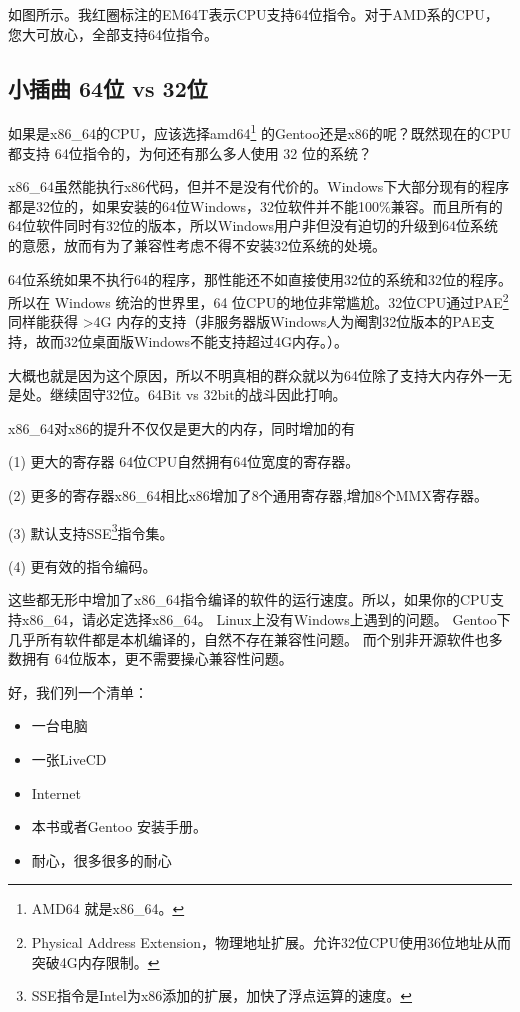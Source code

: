 如图\thefigure{}所示。我红圈标注的EM64T表示CPU支持64位指令。对于AMD系的CPU，您大可放心，全部支持64位指令。


\begin{insertnote}
\subsection*{小插曲  64位 vs 32位}

如果是x86\_64的CPU，应该选择amd64\footnote{AMD64 就是x86\_64。}
的Gentoo还是x86的呢？既然现在的CPU都支持 64位指令的，为何还有那么多人使用 32 位的系统？

x86\_64虽然能执行x86代码，但并不是没有代价的。Windows下大部分现有的程序都是32位的，如果安装的64位Windows，32位软件并不能100\%兼容。而且所有的64位软件同时有32位的版本，所以Windows用户非但没有迫切的升级到64位系统的意愿，放而有为了兼容性考虑不得不安装32位系统的处境。

64位系统如果不执行64的程序，那性能还不如直接使用32位的系统和32位的程序。所以在 Windows 统治的世界里，64 位CPU的地位非常尴尬。32位CPU通过PAE\footnote{Physical Address Extension，物理地址扩展。允许32位CPU使用36位地址从而突破4G内存限制。}同样能获得 >4G 内存的支持（非服务器版Windows人为阉割32位版本的PAE支持，故而32位桌面版Windows不能支持超过4G内存。）。

大概也就是因为这个原因，所以不明真相的群众就以为64位除了支持大内存外一无是处。继续固守32位。64Bit vs 32bit的战斗因此打响。

x86\_64对x86的提升不仅仅是更大的内存，同时增加的有

(1)  更大的寄存器 64位CPU自然拥有64位宽度的寄存器。

(2)  更多的寄存器x86\_64相比x86增加了8个通用寄存器,增加8个MMX寄存器。

(3)  默认支持SSE\footnote{SSE指令是Intel为x86添加的扩展，加快了浮点运算的速度。}指令集。

(4)  更有效的指令编码。

这些都无形中增加了x86\_64指令编译的软件的运行速度。所以，如果你的CPU支持x86\_64，请必定选择x86\_64。
Linux上没有Windows上遇到的问题。
Gentoo下几乎所有软件都是本机编译的，自然不存在兼容性问题。
而个别非开源软件也多数拥有 64位版本，更不需要操心兼容性问题。
\end{insertnote}

好，我们列一个清单：


\begin{itemize}
\item[ \checked] 一台电脑
\item[ \checked] 一张LiveCD
\item[ \checked] Internet
\item[ \checked] 本书或者Gentoo 安装手册。
\item[ \checked] 耐心，很多很多的耐心
\end{itemize}

